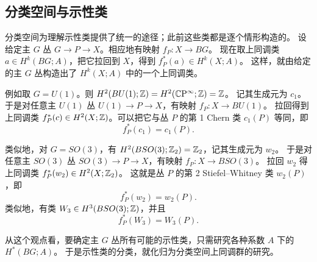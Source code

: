
\subsection{分类空间与示性类}

分类空间为理解示性类提供了统一的途径；此前这些类都是逐个情形构造的。
设给定主 $G$ 丛 $G\to P\to X$。相应地有映射 $f_P:X\to BG$。
现在取上同调类 $a\in H^k(BG;A)$，把它拉回到 $X$，得到 $f_P^*(a)\in H^k(X;A)$。
这样，就由给定的主 $G$ 丛构造出了 $H^k(X;A)$ 中的一个上同调类。

例如取 $G=U(1)$。则 $H^2(BU(1);\mathbb{Z})=H^2(\mathbb{C}\mathrm{P}^\infty;\mathbb{Z})=\mathbb{Z}$。
记其生成元为 $c_1$。于是对任意主 $U(1)$ 丛 $U(1)\to P\to X$，有映射 $f_P:X\to BU(1)$。
拉回得到上同调类 $f_P^*(c)\in H^2(X;\mathbb{Z})$。可以把它与丛 $P$ 的第 1 Chern 类 $c_1(P)$ 等同，即
\begin{equation}
f_P^*(c_1)=c_1(P).
\tag{7.69}
\end{equation}

类似地，对 $G=SO(3)$，有 $H^2(BSO(3);\mathbb{Z}_2)=\mathbb{Z}_2$，记其生成元为 $w_2$。
于是对任意主 $SO(3)$ 丛 $SO(3)\to P\to X$，有映射 $f_P:X\to BSO(3)$。
拉回 $w_2$ 得上同调类 $f_P^*(w_2)\in H^2(X;\mathbb{Z}_2)$。
这就是丛 $P$ 的第 2 Stiefel--Whitney 类 $w_2(P)$，即
\begin{equation}
f_P^*(w_2)=w_2(P).
\tag{7.70}
\end{equation}
类似地，有类 $W_3\in H^3(BSO(3);\mathbb{Z})$，并且
\begin{equation}
f_P^*(W_3)=W_3(P).
\tag{7.71}
\end{equation}

从这个观点看，要确定主 $G$ 丛所有可能的示性类，只需研究各种系数 $A$ 下的 $H^*(BG;A)$。
于是示性类的分类，就化归为分类空间上同调群的研究。


